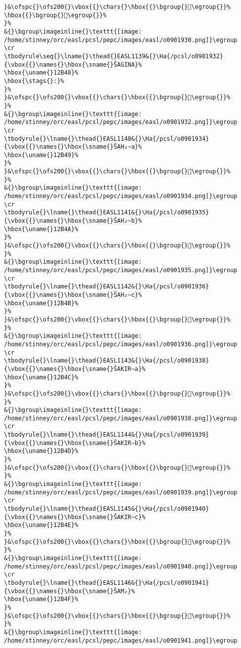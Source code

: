 \begin{verbatim}
}&\ofspc{}\ofs200{}\vbox{{}\chars{}\hbox{{}\bgroup{}𒭆\egroup{}}%
\hbox{{}\bgroup{}𒭇\egroup{}}%
}%
&{}\bgroup\imageinline{}\texttt{[image: /home/stinney/orc/easl/pcsl/pepc/images/easl/o0901930.png]}\egroup
\cr
\tbodyrule\seq{}\lname{}\thead{}EASL1139&{}\Ha{/pcsl/o0901932}{\vbox{{}\names{}\hbox{\sname{}ŠAGINA}%
\hbox{\uname{}12B48}%
\hbox{\stags{}:}%
}%
}&\ofspc{}\ofs200{}\vbox{{}\chars{}\hbox{{}\bgroup{}𒭈\egroup{}}%
}%
&{}\bgroup\imageinline{}\texttt{[image: /home/stinney/orc/easl/pcsl/pepc/images/easl/o0901932.png]}\egroup
\cr
\tbodyrule{}\lname{}\thead{}EASL1140&{}\Ha{/pcsl/o0901934}{\vbox{{}\names{}\hbox{\sname{}ŠAH₂∼a}%
\hbox{\uname{}12B49}%
}%
}&\ofspc{}\ofs200{}\vbox{{}\chars{}\hbox{{}\bgroup{}𒭉\egroup{}}%
}%
&{}\bgroup\imageinline{}\texttt{[image: /home/stinney/orc/easl/pcsl/pepc/images/easl/o0901934.png]}\egroup
\cr
\tbodyrule{}\lname{}\thead{}EASL1141&{}\Ha{/pcsl/o0901935}{\vbox{{}\names{}\hbox{\sname{}ŠAH₂∼b}%
\hbox{\uname{}12B4A}%
}%
}&\ofspc{}\ofs200{}\vbox{{}\chars{}\hbox{{}\bgroup{}𒭊\egroup{}}%
}%
&{}\bgroup\imageinline{}\texttt{[image: /home/stinney/orc/easl/pcsl/pepc/images/easl/o0901935.png]}\egroup
\cr
\tbodyrule{}\lname{}\thead{}EASL1142&{}\Ha{/pcsl/o0901936}{\vbox{{}\names{}\hbox{\sname{}ŠAH₂∼c}%
\hbox{\uname{}12B4B}%
}%
}&\ofspc{}\ofs200{}\vbox{{}\chars{}\hbox{{}\bgroup{}𒭋\egroup{}}%
}%
&{}\bgroup\imageinline{}\texttt{[image: /home/stinney/orc/easl/pcsl/pepc/images/easl/o0901936.png]}\egroup
\cr
\tbodyrule{}\lname{}\thead{}EASL1143&{}\Ha{/pcsl/o0901938}{\vbox{{}\names{}\hbox{\sname{}ŠAKIR∼a}%
\hbox{\uname{}12B4C}%
}%
}&\ofspc{}\ofs200{}\vbox{{}\chars{}\hbox{{}\bgroup{}𒭌\egroup{}}%
}%
&{}\bgroup\imageinline{}\texttt{[image: /home/stinney/orc/easl/pcsl/pepc/images/easl/o0901938.png]}\egroup
\cr
\tbodyrule{}\lname{}\thead{}EASL1144&{}\Ha{/pcsl/o0901939}{\vbox{{}\names{}\hbox{\sname{}ŠAKIR∼b}%
\hbox{\uname{}12B4D}%
}%
}&\ofspc{}\ofs200{}\vbox{{}\chars{}\hbox{{}\bgroup{}𒭍\egroup{}}%
}%
&{}\bgroup\imageinline{}\texttt{[image: /home/stinney/orc/easl/pcsl/pepc/images/easl/o0901939.png]}\egroup
\cr
\tbodyrule{}\lname{}\thead{}EASL1145&{}\Ha{/pcsl/o0901940}{\vbox{{}\names{}\hbox{\sname{}ŠAKIR∼c}%
\hbox{\uname{}12B4E}%
}%
}&\ofspc{}\ofs200{}\vbox{{}\chars{}\hbox{{}\bgroup{}𒭎\egroup{}}%
}%
&{}\bgroup\imageinline{}\texttt{[image: /home/stinney/orc/easl/pcsl/pepc/images/easl/o0901940.png]}\egroup
\cr
\tbodyrule{}\lname{}\thead{}EASL1146&{}\Ha{/pcsl/o0901941}{\vbox{{}\names{}\hbox{\sname{}ŠAM₂}%
\hbox{\uname{}12B4F}%
}%
}&\ofspc{}\ofs200{}\vbox{{}\chars{}\hbox{{}\bgroup{}𒭏\egroup{}}%
}%
&{}\bgroup\imageinline{}\texttt{[image: /home/stinney/orc/easl/pcsl/pepc/images/easl/o0901941.png]}\egroup

\end{verbatim}
